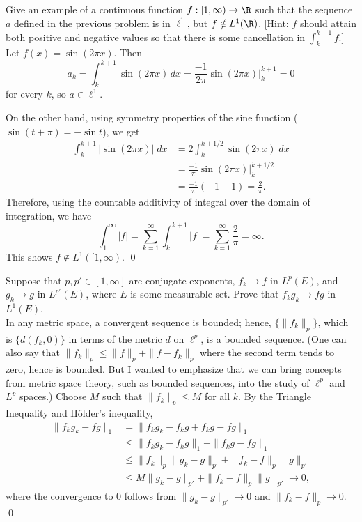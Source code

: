\begin{hwsol}
Give an example of a continuous function $f: [1, \infty) \to \R$ such that the sequence $a$ defined in the previous problem is in $\ell^1$, but $f \notin L^1(\R)$. [Hint: $f$ should attain both positive and negative values so that there is some cancellation in $\int_k^{k+1} f$.] \\

\pf Let $f(x)= \sin (2\pi x)$. Then 
        \[
        a_k = \int_k^{k+1} \sin (2\pi x)\,dx =
        \frac{-1}{2 \pi} \sin (2\pi x)\bigg|_{k}^{k+1} = 0
        \]
for every $k$, so $a\in \ell^1$. 

On the other hand, using symmetry properties of the sine function ($\sin (t+\pi) = -\sin t$), we get  
        \[ 
        \begin{split}
        \int_k^{k+1} |\sin (2\pi x)| \;dx&= 2\int_k^{k+1/2} \sin (2\pi x) \;dx \\
        &= \frac{-1}{\pi} \sin (2\pi x) \bigg|_{k}^{k+1/2} \\  
        &=  \frac{-1}{\pi}(-1-1)= \frac{2}{\pi}.
        \end{split} 
        \]
Therefore, using the countable additivity of integral over the domain of integration, we have
        \[
        \int_1^\infty |f|= \sum_{k=1}^\infty  \int_k^{k+1} |f|= \sum_{k=1}^\infty  \frac{2}{\pi}= \infty.
        \]
This shows $f \notin L^1([1, \infty)$. \qed \\
\end{hwsol}


\begin{hwsol}
Suppose that $p, p' \in [1,\infty]$ are conjugate exponents, $f_k \to f$ in $L^p(E)$, and $g_k \to g$ in $L^{p'}(E)$, where $E$ is some measurable set. Prove that $f_k g_k \to fg$ in $L^1(E)$. \\

\pf In any metric space, a convergent sequence is bounded; hence, $\{ \|f_k\|_p \}$, which is $\{ d(f_k, 0) \}$ in terms of the metric $d$ on $\ell^p$, is a bounded sequence. (One can also say that $\|f_k\|_p \leq \|f\|_p + \|f - f_k\|_p$ where the second term tends to zero, hence is bounded. But I wanted to emphasize that we can bring concepts from metric space theory, such as bounded sequences, into the study of $\ell^p$ and $L^p$ spaces.) Choose $M$ such that $\|f_k\|_p \leq M$ for all $k$. By the Triangle Inequality and H\"older's inequality, 
        \[
        \begin{split}
        \|f_kg_k - fg\|_1&= \|f_kg_k - f_kg + f_kg - fg\|_1 \\
        &\leq \|f_kg_k - f_kg\|_1 + \|f_kg - fg\|_1 \\
        &\leq \|f_k\|_p \|g_k - g\|_{p'} + \|f_k - f\|_p \|g\|_{p'} \\
        &\leq M \|g_k - g\|_{p'} + \|f_k - f\|_p \|g\|_{p'} \to 0,
        \end{split}
        \]
where the convergence to $0$ follows from $\|g_k - g\|_{p'} \to 0$ and $\|f_k - f\|_p \to 0$. \qed \\
\end{hwsol}
 

